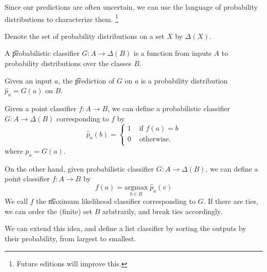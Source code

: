

Since our predictions are often uncertain, we can use the language of probability distributions to characterize them.
  \ifhmode\unskip\fi\footnote{
Future editions will improve this.
  }


Denote the set of probability distributions on a set $X$ by $\Delta(X)$.

A \t{probabilistic classifier} $G: A \to \Delta(B)$ is a function from inputs $A$ to probability distributions over the classes $B$.

Given an input $a$, the \t{prediction} of $G$ on $a$ is a probability distribution $\hat{p}_a = G(a)$ on $B$.


Given a point classifier $f: A \to B$, we can define a probabilistic classifier $G: A \to \Delta(B)$ corresponding to $f$ by
  \[
\hat{p}_a(b) =
\begin{cases}
1 & \text{ if } f(a) = b \\
0 & \text{ otherwise.} \\
\end{cases}
  \]
where $\hat{p}_a = G(a).$


On the other hand, given probabilistic classifier $G: A \to \Delta(B)$, we can define a point classifier $f: A \to B$ by
  \[
f(a) = \underset{b \in B}{\text{argmax}} \; \hat{p}_a(v)
  \]
We call $f$ the \t{maximum likelihood classifier} corresponding to $G$.
If there are ties, we can order the (finite) set $B$ arbitrarily, and break ties accordingly.

We can extend this idea, and define a list classifier by sorting the outputs by their probability, from largest to smallest.


\blankpage
